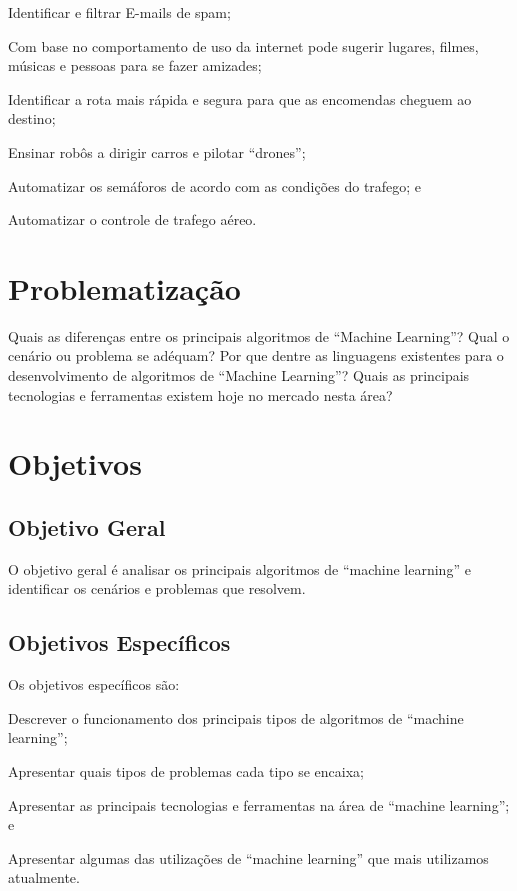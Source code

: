 	\begin{alineas}
			\item Identificar e filtrar E-mails de spam;
			\item Com base no comportamento de uso da internet pode sugerir lugares, filmes, músicas e pessoas para se fazer amizades;
			\item Identificar a rota mais rápida e segura para que as encomendas cheguem ao destino;
			\item Ensinar robôs a dirigir carros e pilotar “drones”;
			\item Automatizar os semáforos de acordo com as condições do trafego; e
			\item Automatizar o controle de trafego aéreo.
	\end{alineas}

\section{Problematização}
\label{sec:Problematizacao}

	Quais as diferenças entre os principais algoritmos de “Machine Learning”? Qual o cenário ou problema se adéquam? Por que dentre as linguagens existentes para o desenvolvimento de algoritmos de “Machine Learning”?  Quais as principais tecnologias e ferramentas existem hoje no mercado nesta área?

\section{Objetivos}
\label{sec:objetivos}
\subsection{Objetivo Geral}
\label{sec:objetivo-geral}

	O objetivo geral é analisar os principais algoritmos de “machine learning” e identificar os cenários e problemas que resolvem.


\subsection{Objetivos Específicos}
\label{sec:objetivos-especificos}

	Os objetivos específicos são: 

	\begin{alineas}
		\item Descrever o funcionamento dos principais tipos de algoritmos de “machine learning”;
		\item Apresentar quais tipos de problemas cada tipo se encaixa;
		\item Apresentar as principais tecnologias e ferramentas na área de “machine learning”; e
		\item Apresentar algumas das utilizações de “machine learning” que mais utilizamos atualmente.		
	\end{alineas}


